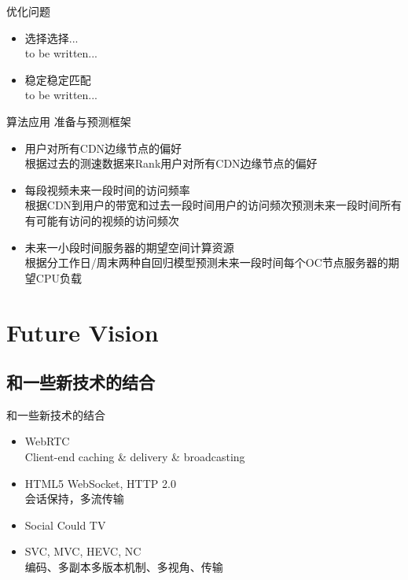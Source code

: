 \documentclass{beamer}
\begin{document}
\begin{frame}{优化问题}
\begin{itemize}
\item 选择选择...\\
to be written...
\item 稳定稳定匹配\\
to be written...
\end{itemize}
\end{frame}
\begin{frame}{算法应用}
准备与预测框架\\
\begin{itemize}
\item 用户对所有CDN边缘节点的偏好\\
根据过去的测速数据来Rank用户对所有CDN边缘节点的偏好
\item 每段视频未来一段时间的访问频率\\
根据CDN到用户的带宽和过去一段时间用户的访问频次预测未来一段时间所有有可能有访问的视频的访问频次
\item 未来一小段时间服务器的期望空间计算资源\\
根据分工作日/周末两种自回归模型预测未来一段时间每个OC节点服务器的期望CPU负载
\end{itemize}
\end{frame}

\section{Future Vision}
\subsection{和一些新技术的结合}
\begin{frame}{和一些新技术的结合}
\begin{itemize}
\item WebRTC\\
Client-end caching \& delivery \& broadcasting
\item HTML5 WebSocket, HTTP 2.0\\
会话保持，多流传输
\item Social Could TV\\
\item SVC, MVC, HEVC, NC\\
编码、多副本多版本机制、多视角、传输
\end{itemize}
\end{frame}
\end{document}
